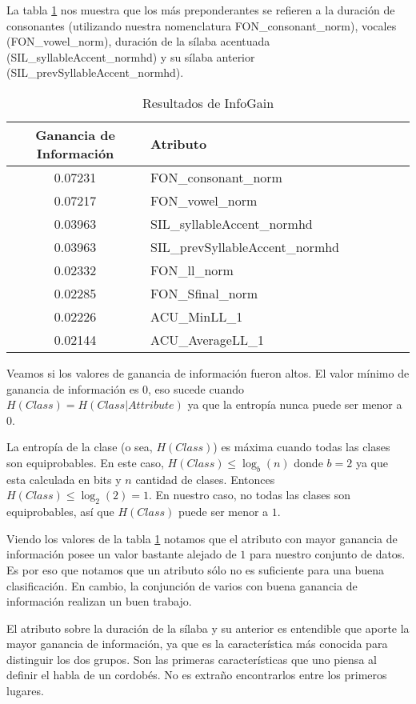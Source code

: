 La tabla \ref{infogain-table} nos muestra que los más preponderantes se refieren a la duración de consonantes (utilizando nuestra nomenclatura FON\_consonant\_norm), vocales (FON\_vowel\_norm), duración de la sílaba acentuada (SIL\_syllableAccent\_\-normhd) y su sílaba anterior \\ (SIL\_prevSyllableAccent\_normhd). 	 

\begin{table}[H]
\centering
\begin{tabular}{|c|l|c|c|c|c|c|}
\hline
\textbf{Ganancia de Información} & \textbf{Atributo} \\ \hline
 0.07231     & FON\_consonant\_norm \\ \hline
 0.07217     & FON\_vowel\_norm \\ \hline
 0.03963     & SIL\_syllableAccent\_normhd \\ \hline
 0.03963     & SIL\_prevSyllableAccent\_normhd \\ \hline
 0.02332     & FON\_ll\_norm \\ \hline
 0.02285     & FON\_Sfinal\_norm \\ \hline
 0.02226     & ACU\_MinLL\_1 \\ \hline
 0.02144     & ACU\_AverageLL\_1 \\ \hline
\end{tabular}
\caption{Resultados de InfoGain}
\label{infogain-table}
\end{table}

Veamos si los valores de ganancia de información fueron altos. El valor mínimo de ganancia de información es $0$, eso sucede cuando $H(Class) = H(Class | Attribute)$ ya que la entropía nunca puede ser menor a $0$. 

La entropía de la clase (o sea, $H(Class)$) es máxima cuando todas las clases son equiprobables. En este caso, $H(Class) \leq \log_b (n)$ donde $b = 2$ ya que esta calculada en bits y $n$ cantidad de clases. Entonces $H(Class) \leq \log_2 (2) = 1$. En nuestro caso, no todas las clases son equiprobables, así que $H(Class)$ puede ser menor a $1$.

Viendo los valores de la tabla \ref{infogain-table} notamos que el atributo con mayor ganancia de información posee un valor bastante alejado de $1$ para nuestro conjunto de datos. Es por eso que notamos que un atributo sólo no es suficiente para una buena clasificación. En cambio, la conjunción de varios con buena ganancia de información realizan un buen trabajo.

El atributo sobre la duración de la sílaba y su anterior es entendible que aporte la mayor ganancia de información, ya que es la característica más conocida para distinguir los dos grupos. Son las primeras características que uno piensa al definir el habla de un cordobés. No es extraño encontrarlos entre los primeros lugares. 

